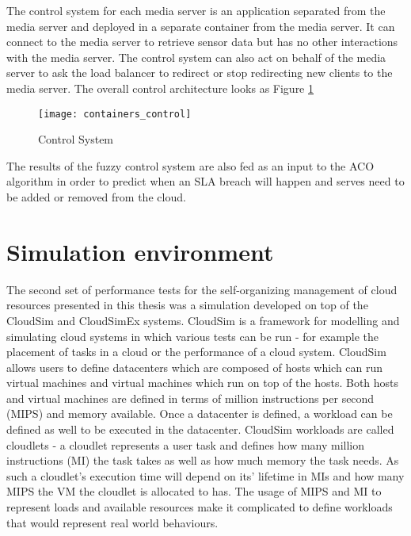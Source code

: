 The control system for each media server is an application separated from the media server and deployed in a separate container from the media server. It can connect to the media server to retrieve sensor data but has no other interactions with the media server. The control system can also act on behalf of the media server to ask the load balancer to redirect or stop redirecting new clients to the media server. The overall control architecture looks as Figure \ref{fig:control-containers}

\begin{figure}
	\centering
	\texttt{[image: containers\_control]}
	\caption{Control System}
	\label{fig:control-containers}
\end{figure}

The results of the fuzzy control system are also fed as an input to the ACO algorithm in order to predict when an SLA breach will happen and serves need to be added or removed from the cloud.

\section{Simulation environment}

The second set of performance tests for the self-organizing management of cloud resources presented in this thesis was a simulation developed on top of the CloudSim and CloudSimEx systems. CloudSim is a framework for modelling and simulating cloud systems in which various tests can be run - for example the placement of tasks in a cloud or the performance of a cloud system. CloudSim allows users to define datacenters which are composed of hosts which can run virtual machines and virtual machines which run on top of the hosts. Both hosts and virtual machines are defined in terms of million instructions per second (MIPS) and memory available. Once a datacenter is defined, a workload can be defined as well to be executed in the datacenter. CloudSim workloads are called cloudlets - a cloudlet represents a user task and defines how many million instructions (MI) the task takes as well as how much memory the task needs. As such a cloudlet's execution time will depend on its' lifetime in MIs and how many MIPS the VM the cloudlet is allocated to has. The usage of MIPS and MI to represent loads and available resources make it complicated to define workloads that would represent real world behaviours.

